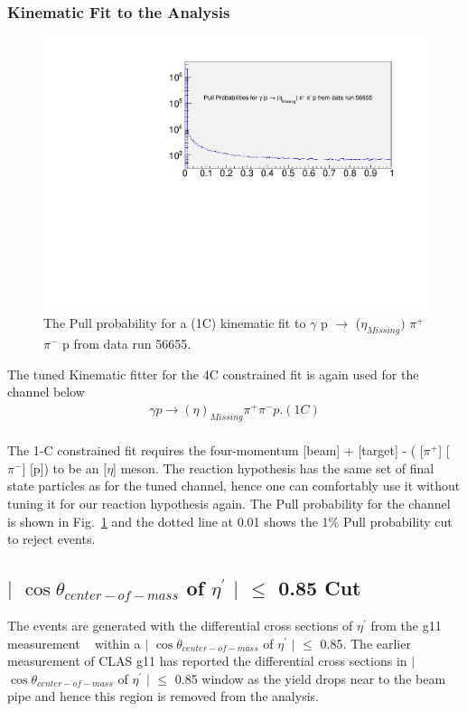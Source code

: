 \subsubsection{Kinematic Fit to the Analysis}
	
\begin{figure}[ht!]
\centerline{
\includegraphics[width=12cm,height=8cm]{Prob_etafit.pdf}}
\caption{The Pull probability for a (1C) kinematic fit to $\gamma$ p $\rightarrow$ ($\eta_{Missing})$ $\pi^{+}$ $\pi^{-}$ p from data run 56655.}
\label{Fig5}
\end{figure} 

The tuned Kinematic fitter for the 4C constrained fit is again used for the channel below
\begin{eqnarray*}
\gamma p \rightarrow (\eta)_{Missing} \pi^{+} \pi^{-} p. (1C)
\end{eqnarray*}\\	
 The 1-C constrained fit requires the four-momentum [beam] + [target] - ( [$\pi^{+}$] [$\pi^{-}$] [p]) to be an [$\eta$] meson. The reaction hypothesis has the same set of final state particles as for the tuned channel, hence one can comfortably use it without tuning it for our reaction hypothesis again. The Pull probability for the channel is shown in Fig.~\ref{Fig5} and the dotted line at 0.01 shows the 1$\%$ Pull probability cut to reject events. 
\FloatBarrier
\subsection{$\mid$ $\cos\theta_{center-of-mass}$ of $\eta^{\prime}$ $\mid$ $\leq$ 0.85 Cut}
\label{Cos}


The events are generated with the differential cross sections of $\eta^{\prime}$ from the g11 measurement ~\cite{Williams:2009yj} within a $\mid$ $\cos\theta_{center-of-mass}$ of $\eta^{\prime}$ $\mid$ $\leq$ 0.85. The earlier measurement of CLAS g11 has reported the differential cross sections in $\mid$ $\cos\theta_{center-of-mass}$ of $\eta^{\prime}$ $\mid$ $\leq$ 0.85 window as the yield drops near to the beam pipe and hence this region is removed from the analysis.  


